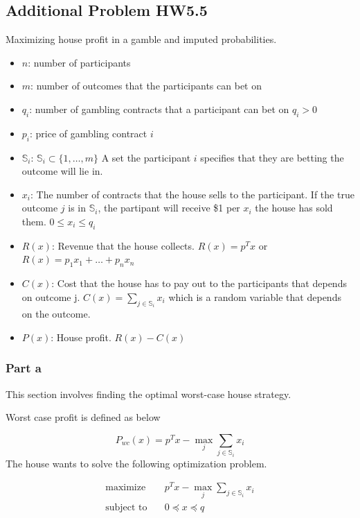 \subsection{Additional Problem HW5.5}
Maximizing house profit in a gamble and imputed probabilities.
\begin{itemize}
  \item $n$: number of participants
  \item $m$: number of outcomes that the participants can bet on
  \item $q_i$: number of gambling contracts that a participant can bet on $q_i > 0$
  \item $p_i$: price of gambling contract $i$
  \item $\mathbb{S}_i$: $\mathbb{S}_i \subset \{ 1,\dots, m \}$ A set the participant $i$ specifies that they are betting the outcome will lie in. 
  \item $x_i$: The number of contracts that the house sells to the participant. If the true outcome $j$ is in $\mathbb{S}_i$, the partipant will receive \$1 per $x_i$ the house has sold them. $0 \leq x_i \leq q_i$
  \item $R(x)$: Revenue that the house collects. $R(x) = p^T x$ or $R(x) = p_1x_1 + \dots + p_nx_n$
  \item $C(x)$: Cost that the house has to pay out to the participants that depends on outcome j. $C(x) = \sum_{j \in \mathbb{S}_i} x_i$ which is a random variable that depends on the outcome.
  \item $P(x)$: House profit. $R(x) - C(x)$
\end{itemize}

\subsubsection{Part a}
This section involves finding the optimal worst-case house strategy.

Worst case profit is defined as below

\begin{equation}
  P_{wc}(x) = p^T x - \max_{j} \sum_{j \in \mathbb{S}_i } x_i
\end{equation}
The house wants to solve the following optimization problem.

\begin{align}
  \text{maximize} & \quad  p^T x - \max_{j} \sum_{j \in \mathbb{S}_i } x_i \\
  \text{subject to} & \quad 0 \preceq x \preceq q
\end{align}


